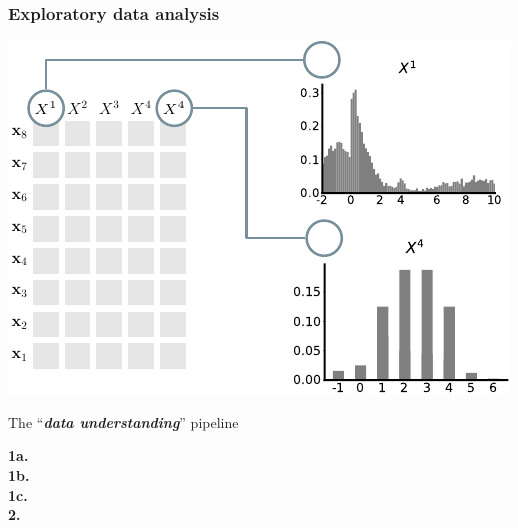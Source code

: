 \documentclass[xcolor={usenames,dvipsnames,svgnames}, compress, aspectratio=169, 11pt]{beamer}
\begin{document}
\begin{frame}[t, htt=bgrey2]
  \frametitle{Exploratory data analysis}

  \large
  \begin{minipage}[t]{0.6\linewidth}
    \vspace{5pt}
    \includegraphics[width=.9\linewidth]{figures/abda-hist-type}
  \end{minipage}\hfill\begin{minipage}[t]{0.4\linewidth}
    \vspace{10pt}
    {The ``\emph{\textbf{data understanding}}'' pipeline}\\[3pt]
    \raggedleft\begin{minipage}[t]{.9\linewidth}
      {\textbf{1a.} \\[-2pt]}
      {\textbf{1b.} \\[-2pt]}
      {\textbf{1c.}\hspace{1pt} \\[-2pt]}
      {\textbf{2.}\hspace{6pt} \\[-2pt]}
    
    \end{minipage}    
  \end{minipage}  
\end{frame}
\end{document}
